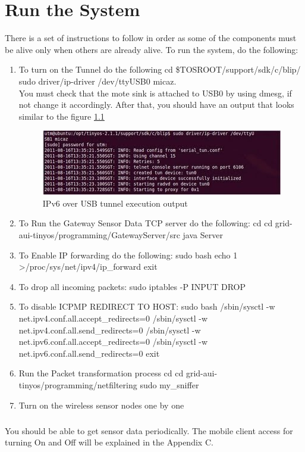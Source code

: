 \documentclass[oneside,12pt,a4paper,final]{book}
\begin{document}
\chapter{Run the System}
There is a set of instructions to follow in order as some of the components must be alive only when others are already alive. To run the system, do the following:
\begin{enumerate}
\item To turn on the Tunnel do the following
\subitem cd \$TOSROOT/support/sdk/c/blip/ 
\subitem sudo driver/ip-driver /dev/ttyUSB0 micaz. \\
 You must check that the mote sink is attached to USB0 by using dmesg, if not change it accordingly. After that, you should have an output that looks similar to the figure \ref{fig:tunnel_output}

\begin{figure}[htbp]
\centering
\includegraphics[scale=0.9]{img/tunnel_output.jpg}
\caption{IPv6 over USB tunnel execution output}
\label{fig:tunnel_output}
\end{figure}

\item To Run the Gateway Sensor Data TCP server do the following:
\subitem cd
\subitem cd grid-aui-tinyos/programming/GatewayServer/src
\subitem java Server

\item To Enable IP forwarding do the following:
\subitem sudo bash
\subitem echo 1 \textgreater /proc/sys/net/ipv4/ip\_forward
\subitem exit

\item  To drop all incoming packets: sudo iptables -P INPUT DROP
\item To disable ICPMP REDIRECT TO HOST:
\subitem sudo bash
\subitem /sbin/sysctl -w net.ipv4.conf.all.accept\_redirects=0
\subitem /sbin/sysctl -w net.ipv4.conf.all.send\_redirects=0
\subitem /sbin/sysctl -w net.ipv6.conf.all.accept\_redirects=0
\subitem /sbin/sysctl -w net.ipv6.conf.all.send\_redirects=0
\subitem exit

\item Run the Packet transformation process
\subitem cd
\subitem cd grid-aui-tinyos/programming/netfiltering
\subitem sudo my\_sniffer

\item Turn on the wireless sensor nodes one by one
\end{enumerate}

\paragraph{}
You should be able to get sensor data periodically. The mobile client access for turning On and Off will be explained in the Appendix C.
\end{document}
